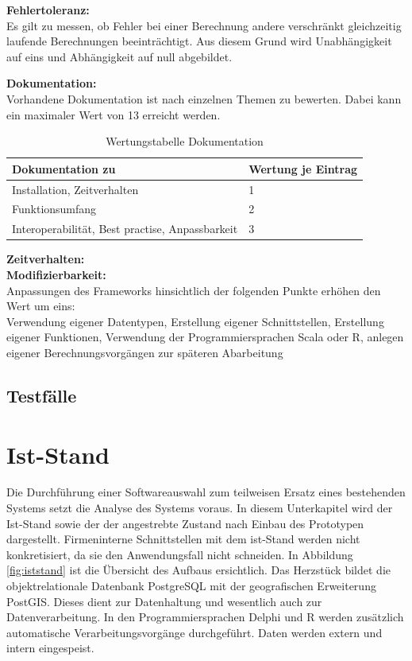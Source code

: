 \textbf{Fehlertoleranz:}\\
Es gilt zu messen, ob Fehler bei einer Berechnung andere verschränkt gleichzeitig laufende Berechnungen beeinträchtigt.
Aus diesem Grund wird Unabhängigkeit auf eins und Abhängigkeit auf null abgebildet.

\textbf{Dokumentation:}\\
Vorhandene Dokumentation ist nach einzelnen Themen zu bewerten.
Dabei kann ein maximaler Wert von 13 erreicht werden.
\begin{table}[h]
\centering
\begin{tabular}{l|l}
\textbf{Dokumentation zu} & \textbf{Wertung je Eintrag} \\ \hline
Installation, Zeitverhalten & 1 \\ \hline
Funktionsumfang & 2 \\ \hline
Interoperabilität, Best practise, Anpassbarkeit & 3 
\end{tabular}
\caption{Wertungstabelle Dokumentation}
\label{table:dokumentation}
\end{table}

\textbf{Zeitverhalten:}\\


\textbf{Modifizierbarkeit:}\\
Anpassungen des Frameworks hinsichtlich der folgenden Punkte erhöhen den Wert um eins:\\
Verwendung eigener Datentypen, Erstellung eigener Schnittstellen, Erstellung eigener Funktionen, Verwendung der Programmiersprachen Scala oder R, anlegen eigener Berechnungsvorgängen zur späteren Abarbeitung

\subsection{Testfälle}

%

\section{Ist-Stand}
\label{IstStand}

Die Durchführung einer Softwareauswahl zum teilweisen Ersatz eines bestehenden Systems setzt die Analyse des Systems voraus.
In diesem Unterkapitel wird der Ist-Stand sowie der der angestrebte Zustand nach Einbau des Prototypen dargestellt.
Firmeninterne Schnittstellen mit dem ist-Stand werden nicht konkretisiert, da sie den Anwendungsfall nicht schneiden.
In Abbildung \ref{fig:iststand} ist die Übersicht des Aufbaus ersichtlich.
Das Herzstück bildet die objektrelationale Datenbank PostgreSQL mit der geografischen Erweiterung PostGIS.
Dieses dient zur Datenhaltung und wesentlich auch zur Datenverarbeitung.
In den Programmiersprachen Delphi und R werden zusätzlich automatische Verarbeitungsvorgänge durchgeführt.
Daten werden extern und intern eingespeist.


